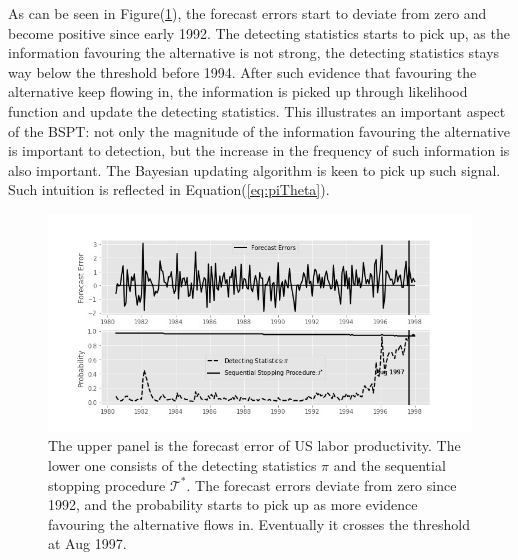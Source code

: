 \documentclass[preprint,authoryear,12pt,english]{elsarticle}
\theoremstyle{plain}
\begin{document}
As can be seen in Figure(\ref{fig:USlaborProd}), the forecast errors start to deviate from zero and become positive since early 1992. The detecting statistics starts to pick up, as the information favouring the alternative is not strong, the detecting statistics stays way below the threshold before 1994. After such evidence that favouring the alternative keep flowing in, the information is picked up through likelihood function and update the detecting statistics. This illustrates an important aspect of the BSPT: not only the magnitude of the information favouring the alternative is important to detection, but the increase in the frequency of such information is also important. The Bayesian updating algorithm is keen to pick up such signal. Such intuition is reflected in Equation(\ref{eq:piTheta}).
\noindent \begin{center}
    \begin{figure}[H]
        \centering
        \begin{minipage}[c]{1\textwidth}
            \centering
            \includegraphics[scale=0.5]{"graph/US_labor_prod"}
            \protect\caption{\label{fig:USlaborProd}The upper panel is the forecast error of US labor productivity. The lower one consists of the detecting statistics $\pi$ and the sequential stopping procedure $\mathcal{T}^{*}$. The forecast errors deviate from zero since 1992, and the probability starts to pick up as more evidence favouring the alternative flows in. Eventually it crosses the threshold at Aug 1997.}
        \end{minipage}
    \end{figure}
    \par\end{center}
\end{document}
